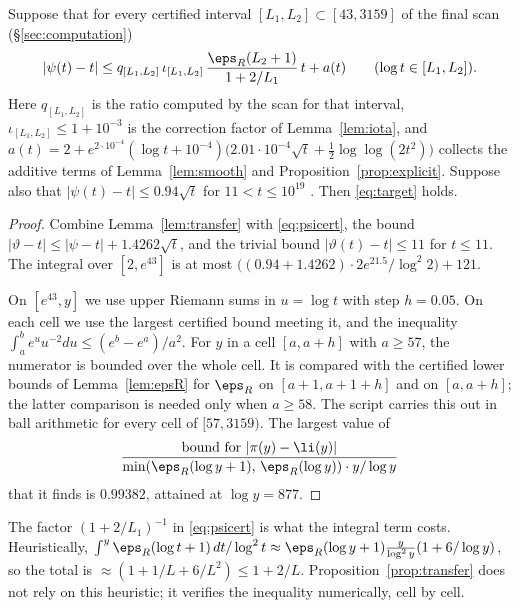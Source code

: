 \begin{proposition}\label{prop:transfer}
Suppose that for every certified interval $[L_1, L_2] \subset [43, 3159]$ of the final scan (\S\ref{sec:computation})
\begin{equation}\label{eq:psicert}
|\psi(t) - t| \le q_{[L_1,L_2]}\,\iota_{[L_1,L_2]}\,\frac{\eps_R(L_2+1)}{1 + 2/L_1}\, t + a(t) \qquad (\log t \in [L_1, L_2]).
\end{equation}
Here $q_{[L_1,L_2]}$ is the ratio computed by the scan for that interval, $\iota_{[L_1,L_2]} \le 1 + 10^{-3}$ is the correction factor of Lemma~\ref{lem:iota}, and $a(t) = 2 + e^{2\cdot 10^{-4}}(\log t + 10^{-4})\big(2.01\cdot 10^{-4}\sqrt t + \tfrac12\log\log(2t^2)\big)$ collects the additive terms of Lemma~\ref{lem:smooth} and Proposition~\ref{prop:explicit}.
Suppose also that $|\psi(t) - t| \le 0.94\sqrt t$ for $11 < t \le 10^{19}$ \cite[Thm.~2]{Buthe2018}.
Then \eqref{eq:target} holds.
\end{proposition}

\begin{proof}
Combine Lemma~\ref{lem:transfer} with \eqref{eq:psicert}, the bound $|\vartheta - t| \le |\psi - t| + 1.4262\sqrt t$, and the trivial bound $|\vartheta(t) - t| \le 11$ for $t \le 11$.
The integral over $[2, e^{43}]$ is at most
$\big((0.94 + 1.4262)\cdot 2 e^{21.5}/\log^2 2\big) + 121$.

On $[e^{43}, y]$ we use upper Riemann sums in $u = \log t$ with step $h = 0.05$.
On each cell we use the largest certified bound meeting it, and the inequality $\int_a^b e^u u^{-2}du \le (e^b - e^a)/a^2$.
For $y$ in a cell $[a, a+h]$ with $a \ge 57$, the numerator is bounded over the whole cell.
It is compared with the certified lower bounds of Lemma~\ref{lem:epsR} for $\eps_R$ on $[a+1, a+1+h]$ and on $[a, a+h]$; the latter comparison is needed only when $a \ge 58$.
The script  carries this out in ball arithmetic for every cell of $[57, 3159)$.
The largest value of
\[
\frac{\text{bound for } |\pi(y) - \li(y)|}{\min(\eps_R(\log y+1),\,\eps_R(\log y))\cdot y/\log y}
\]
that it finds is $0.99382$, attained at $\log y = 877$.
\end{proof}

\begin{remark}
The factor $(1+2/L_1)^{-1}$ in \eqref{eq:psicert} is what the integral term costs.
Heuristically, $\int^{y}\eps_R(\log t+1)\,dt/\log^2 t \approx \eps_R(\log y+1)\frac{y}{\log^2 y}(1 + 6/\log y)$, so the total is $\approx(1 + 1/L + 6/L^2) \le 1 + 2/L$.
Proposition~\ref{prop:transfer} does not rely on this heuristic; it verifies the inequality numerically, cell by cell.
\end{remark}

